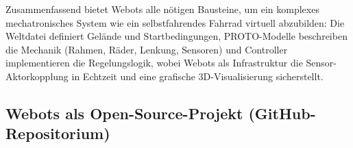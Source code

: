 \documentclass[11pt]{article}
\begin{document}
Zusammenfassend bietet Webots alle nötigen Bausteine, um ein komplexes mechatronisches System wie ein selbstfahrendes Fahrrad virtuell 
abzubilden: Die Weltdatei definiert Gelände und Startbedingungen, PROTO-Modelle beschreiben die Mechanik (Rahmen, Räder, Lenkung, Sensoren)
und Controller implementieren die Regelungslogik, wobei Webots als Infrastruktur die Sensor-Aktorkopplung in Echtzeit und eine grafische
3D-Visualisierung sicherstellt.


\subsection{Webots als Open-Source-Projekt (GitHub-Repositorium)}


\newpage


\end{document}
